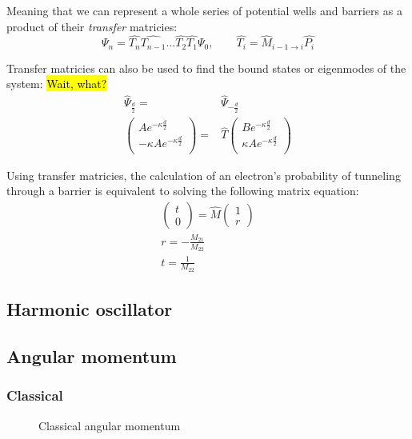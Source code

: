 			Meaning that we can represent a whole series of potential wells and barriers as a product of their \textit{transfer} matricies:
			\begin{equation}
				\Psi_n = \hat{T_n}\hat{T_{n-1}}...\hat{T_2}\hat{T_1}\Psi_0, \qquad \hat{T_i} = \hat{M}_{i-1\rightarrow i}\hat{P_i} 
			\end{equation}
			
			Transfer matricies can also be used to find the bound states or eigenmodes of the system:
			\hl{Wait, what?}
			\begin{align}
				\hat{\Psi}_{\frac{d}{2}} =& \hat{\Psi}_{-\frac{d}{2}} \\
				\begin{pmatrix}
					Ae^{-\kappa \frac{d}{2}} \\
					-\kappa Ae^{-\kappa \frac{d}{2}} \\
				\end{pmatrix} =& \hat{T} 
				\begin{pmatrix}
					Be^{-\kappa \frac{d}{2}} \\
					\kappa Ae^{-\kappa \frac{d}{2}} \\
				\end{pmatrix}
			\end{align}
			
			Using transfer matricies, the calculation of an electron's probability of tunneling through a barrier is equivalent to solving the following matrix equation:
			\begin{align}
				\begin{pmatrix}
					t \\
					0
				\end{pmatrix} = \hat{M}
				\begin{pmatrix}
					1 \\
					r
				\end{pmatrix} \\
				r  = -\frac{M_{21}}{M_{22}} \\
				t = \frac{1}{M_{22}}
			\end{align}
	\subsection{Harmonic oscillator}
	\subsection{Angular momentum}
	\subsubsection{Classical}
	\begin{figure}[!h]
		\centering
		
		\caption{Classical angular momentum}
		\label{clasmoment}
	\end{figure}
	
